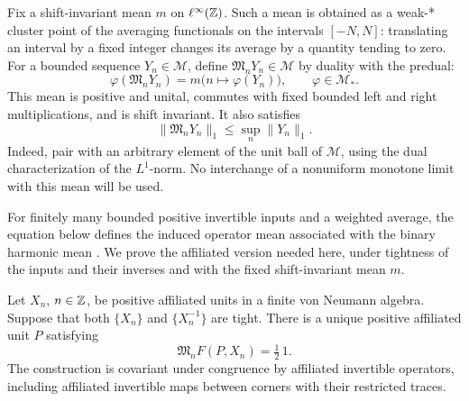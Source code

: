 Fix a shift-invariant mean \(m\) on \(\ell^\infty(\mathbb Z)\).  Such a mean
is obtained as a weak-* cluster point of the averaging functionals
on the intervals \([-N,N]\): translating an interval by a fixed
integer changes its average by a quantity tending to zero.
For a bounded
sequence \(Y_n\in\mathcal M\), define \(\mathfrak M_nY_n\in\mathcal M\)
by duality with the predual:
\[
 \varphi(\mathfrak M_nY_n)=m\bigl(n\mapsto\varphi(Y_n)\bigr),
 \qquad \varphi\in\mathcal M_*.
\]
This mean is positive and unital, commutes with fixed bounded left
and right multiplications, and is shift invariant.  It also satisfies
\begin{equation}\label{coeff:analytic-mean-L1}
 \|\mathfrak M_nY_n\|_1\le\sup_n\|Y_n\|_1.
\end{equation}
Indeed, pair with an arbitrary element of the unit ball of
\(\mathcal M\), using the dual characterization of the \(L^1\)-norm.
No interchange of a nonuniform monotone limit with this mean will be
used.

For finitely many bounded positive invertible inputs and a weighted
average, the equation below defines the induced operator mean
associated with the binary harmonic mean
\cite[Proposition~6.2]{Palfia2013Means}. We prove the affiliated
version needed here, under tightness of the inputs and their inverses
and with the fixed shift-invariant mean \(m\).

\begin{proposition}
\label{coeff:analytic-mean}
Let \(X_n\), \(n\in\mathbb Z\), be positive affiliated units in a finite von
Neumann algebra.  Suppose that both \(\{X_n\}\) and \(\{X_n^{-1}\}\)
are tight.  There is a unique positive affiliated unit \(P\) satisfying
\begin{equation}\label{coeff:analytic-mean-equation}
 \mathfrak M_nF(P,X_n)=\tfrac12\,1.
\end{equation}
The construction is covariant under congruence by affiliated
invertible operators, including affiliated invertible maps between
corners with their restricted traces.
\end{proposition}

